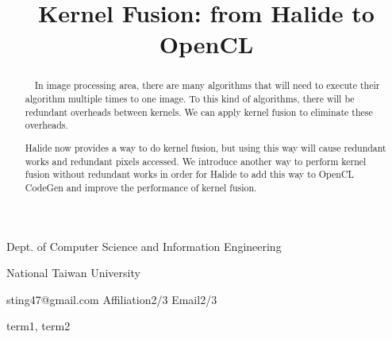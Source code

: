 \documentclass{sigplanconf}
\begin{document}
\setlength{\pdfpageheight}{\paperheight}
\setlength{\pdfpagewidth}{\paperwidth}






\title{Kernel Fusion: from Halide to OpenCL}

           {Dept. of Computer Science and Information Engineering
           
           National Taiwan University}
           {sting47@gmail.com}
           {Affiliation2/3}
           {Email2/3}

\maketitle

\begin{abstract}
\quad\ \ In image processing area, there are many algorithms that will need to execute their algorithm multiple times to one image. To this kind of algorithms, there will be redundant overheads between kernels. We can apply kernel fusion to eliminate these overheads. 
    
    Halide now provides a way to do kernel fusion, but using this way will cause redundant works and redundant pixels accessed. We introduce another way to perform kernel fusion without redundant works in order for Halide to add this way to OpenCL CodeGen and improve the performance of kernel fusion.
\end{abstract}


\terms
term1, term2
\end{document}
